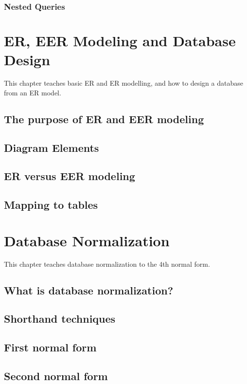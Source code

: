 \subsection{Nested Queries}

\chapter{ER, EER Modeling and Database Design}
\label{chap:relational:eer-modeling-and-database-design}
This chapter teaches basic ER and ER modelling, and how to design a database from an ER model.

\section{The purpose of ER and EER modeling}
\section{Diagram Elements}
\section{ER versus EER modeling}
\section{Mapping to tables}

\chapter{Database Normalization}
\label{chap:relational:database-normalization}
This chapter teaches database normalization to the 4th normal form.

\section{What is database normalization?}
\section{Shorthand techniques}
\section{First normal form}
\section{Second normal form}
